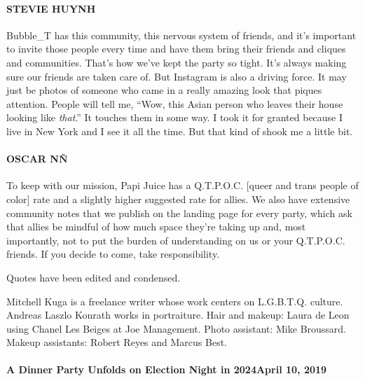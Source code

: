 \hypertarget{stevie-huynh-2}{%
\paragraph{STEVIE HUYNH}\label{stevie-huynh-2}}

Bubble\_T has this community, this nervous system of friends, and it's
important to invite those people every time and have them bring their
friends and cliques and communities. That's how we've kept the party so
tight. It's always making sure our friends are taken care of. But
Instagram is also a driving force. It may just be photos of someone who
came in a really amazing look that piques attention. People will tell
me, ``Wow, this Asian person who leaves their house looking like
\emph{that}.'' It touches them in some way. I took it for granted
because I live in New York and I see it all the time. But that kind of
shook me a little bit.

\hypertarget{oscar-nuxf1-2}{%
\paragraph{OSCAR NÑ}\label{oscar-nuxf1-2}}

To keep with our mission, Papi Juice has a Q.T.P.O.C. {[}queer and trans
people of color{]} rate and a slightly higher suggested rate for allies.
We also have extensive community notes that we publish on the landing
page for every party, which ask that allies be mindful of how much space
they're taking up and, most importantly, not to put the burden of
understanding on us or your Q.T.P.O.C. friends. If you decide to come,
take responsibility.

Quotes have been edited and condensed.

Mitchell Kuga is a freelance writer whose work centers on L.G.B.T.Q.
culture. Andreas Laszlo Konrath works in portraiture. Hair and makeup:
Laura de Leon using Chanel Les Beiges at Joe Management. Photo
assistant: Mike Broussard. Makeup assistants: Robert Reyes and Marcus
Best.

\href{https://www.nytimes3xbfgragh.onion/interactive/2019/04/10/t-magazine/humberto-leon-carol-lim.html}{}

\hypertarget{a-dinner-party-unfolds-on-election-night-in-2024april-10-2019}{%
\paragraph{A Dinner Party Unfolds on Election Night in 2024April 10,
2019}\label{a-dinner-party-unfolds-on-election-night-in-2024april-10-2019}}

